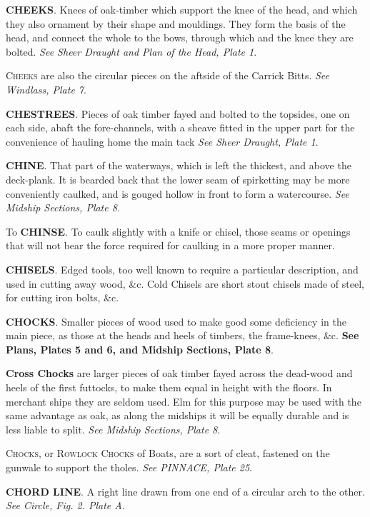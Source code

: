 \textbf{CHEEKS}. Knees of oak-timber which support the knee of the head, and which they also ornament by their shape and mouldings. They form the basis of the head, and connect the whole to the bows, through which and the knee they are bolted. \textit{See Sheer Draught and Plan of the Head, Plate 1}. 

\textsc{Cheeks} are also the circular pieces on the aftside of the Carrick Bitts. \textit{See Windlass, Plate 7}. 

\textbf{CHESTREES}. Pieces of oak timber fayed and bolted to the topsides, one on each side, abaft the fore-channels, with a sheave fitted in the upper part for the convenience of hauling home the main tack \textit{See Sheer Draught, Plate 1}. 

\textbf{CHINE}. That part of the waterways, which is left the thickest, and above the deck-plank. It is bearded back that the lower seam of spirketting may be more conveniently caulked, and is gouged hollow in front to form a watercourse. \textit{See Midship Sections, Plate 8}. 

To \textbf{CHINSE}. To caulk slightly with a knife or chisel, those seams or openings that will not bear the force required for caulking in a more proper manner.

\textbf{CHISELS}. Edged tools, too well known to require a particular description, and used in cutting away wood, \&c. Cold Chisels are short stout chisels made of steel, for cutting iron bolts, \&c. 

\textbf{CHOCKS}. Smaller pieces of wood used to make good some deficiency in the main piece, as those at the heads and heels of timbers, the frame-knees, \&c. \textbf{See Plans, Plates 5 and 6, and Midship Sections, Plate 8}. 

\textbf{Cross Chocks} are larger pieces of oak timber fayed across the dead-wood and heels of the first futtocks, to make them equal in height with the floors. In merchant ships they are seldom used. Elm for this purpose may be used with the same advantage as oak, as along the midships it will be equally durable and is less liable to split. \textit{See Midship Sections, Plate 8}. 

\textsc{Chocks}, or \textsc{Rowlock Chocks} of Boats, are a sort of cleat, fastened on the gunwale to support the tholes. \textit{See PINNACE, Plate 25}. 

\textbf{CHORD LINE}. A right line drawn from one end of a circular arch to the other. \textit{See Circle, Fig. 2. Plate A.}

